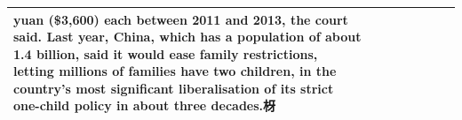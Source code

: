 \begin{table}[H]
\begin{tabular}{llrlllll}
yuan (\$3,600) each between 2011 and 2013, the court said. Last year, China, which has a population of about 1.4 billion, said it would ease family restrictions, letting millions of families have two children, in the country's most significant liberalisation of its strict one-child policy in about three decades.枒 \\
\bottomrule
\end{tabular}
\end{table}
